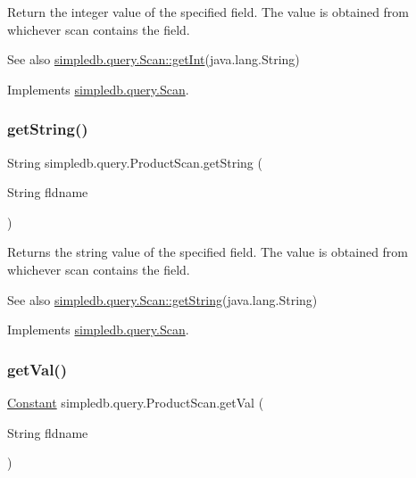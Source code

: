 Return the integer value of the specified field. The value is obtained from whichever scan contains the field. \begin{DoxySeeAlso}{See also}
\hyperlink{interfacesimpledb_1_1query_1_1Scan_a2e064555e16240115167b5d42d2b3d19}{simpledb.\+query.\+Scan\+::get\+Int}(java.\+lang.\+String) 
\end{DoxySeeAlso}


Implements \hyperlink{interfacesimpledb_1_1query_1_1Scan_a2e064555e16240115167b5d42d2b3d19}{simpledb.\+query.\+Scan}.

\mbox{\label{classsimpledb_1_1query_1_1ProductScan_a2fda3abb7dc55d443791b8e5664ef1e3}} 
\subsubsection{\texorpdfstring{get\+String()}{getString()}}
{\footnotesize\ttfamily String simpledb.\+query.\+Product\+Scan.\+get\+String (\begin{DoxyParamCaption}\item[{String}]{fldname }\end{DoxyParamCaption})\hspace{0.3cm}{\ttfamily [inline]}}

Returns the string value of the specified field. The value is obtained from whichever scan contains the field. \begin{DoxySeeAlso}{See also}
\hyperlink{interfacesimpledb_1_1query_1_1Scan_a922e219fee53ecfa6163525f9e3ef222}{simpledb.\+query.\+Scan\+::get\+String}(java.\+lang.\+String) 
\end{DoxySeeAlso}


Implements \hyperlink{interfacesimpledb_1_1query_1_1Scan_a922e219fee53ecfa6163525f9e3ef222}{simpledb.\+query.\+Scan}.

\mbox{\label{classsimpledb_1_1query_1_1ProductScan_ade690f4d248b8d489e9565bb73e0cf59}} 
\subsubsection{\texorpdfstring{get\+Val()}{getVal()}}
{\footnotesize\ttfamily \hyperlink{classsimpledb_1_1query_1_1Constant}{Constant} simpledb.\+query.\+Product\+Scan.\+get\+Val (\begin{DoxyParamCaption}\item[{String}]{fldname }\end{DoxyParamCaption})\hspace{0.3cm}{\ttfamily [inline]}}

